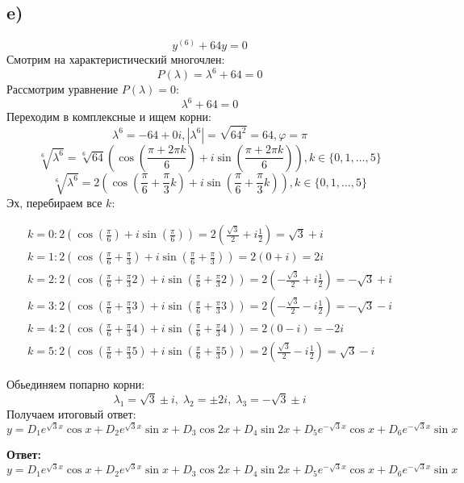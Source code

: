 \documentclass[a4paper, 12pt]{article}
\begin{document}
\subsection*{e)}
\[
y^{(6)} + 64y = 0
\]
Смотрим на характеристический многочлен:
\[
P(\lambda) = \lambda^6  + 64 = 0
\]
Рассмотрим уравнение $P(\lambda) = 0$:
\[
\lambda^6 + 64= 0
\]
Переходим в комплексные и ищем корни:
\[
\lambda^6 = -64 +0i, |\lambda^6| = \sqrt{64^2} = 64, \varphi = \pi
\]
\[
\sqrt[6]{\lambda^6} =
\sqrt[6]{64}
\left(
\cos 
\left(
\frac{\pi + 2 \pi k}{6}
\right)
+i
\sin
\left(
\frac{\pi + 2 \pi k}{6}
\right)
\right), k \in \{0, 1, \ldots, 5\}
\]
\[
\sqrt[6]{\lambda^6} =
2
\left(
\cos 
\left(
\frac{\pi}{6} + \frac{\pi}{3} k
\right)
+i
\sin
\left(
\frac{\pi}{6} + \frac{\pi}{3} k
\right)
\right), k \in \{0, 1, \ldots, 5\}
\]
Эх, перебираем все $k$:
\begin{flushleft}
\begin{equation*}
\begin{gathered}
k = 0:
 2 \left( \cos  \left(
\frac{\pi}{6}
\right) 
+ i \sin \left(
\frac{\pi}{6}
\right) \right)
=
2 \left(
\frac{\sqrt{3}}{2} + i\frac{1}{2}
\right)
=
\sqrt{3} + i 
\\
k = 1:
 2 \left( \cos  \left(
\frac{\pi}{6} + \frac{\pi}{3}
\right) 
+ i \sin \left(
\frac{\pi}{6} + \frac{\pi}{3}
\right) \right)
=
2 \left(
0 + i
\right)
=2i 
\\
k = 2:
 2 \left( \cos  \left(
\frac{\pi}{6} + \frac{\pi}{3} 2
\right) 
+ i \sin \left(
\frac{\pi}{6} + \frac{\pi}{3} 2
\right) \right)
=
2 \left(
-\frac{\sqrt{3}}{2} + i\frac{1}{2}
\right)
=
-\sqrt{3} + i
\\
k = 3:
 2 \left( \cos  \left(
\frac{\pi}{6} + \frac{\pi}{3} 3
\right) 
+ i \sin \left(
\frac{\pi}{6} + \frac{\pi}{3} 3
\right) \right)
=
2 \left(
-\frac{\sqrt{3}}{2} - i\frac{1}{2}
\right)
=
-\sqrt{3} -i
\\
 k = 4:
 2 \left( \cos  \left(
\frac{\pi}{6} + \frac{\pi}{3} 4
\right) 
+ i \sin \left(
\frac{\pi}{6} + \frac{\pi}{3} 4
\right) \right)
=
2 \left(
0 - i
\right)
= -2i
\\
k = 5:
 2 \left( \cos  \left(
\frac{\pi}{6} + \frac{\pi}{3} 5
\right) 
+ i \sin \left(
\frac{\pi}{6} + \frac{\pi}{3} 5
\right) \right)
=
2 \left(
\frac{\sqrt{3}}{2} - i \frac{1}{2}
\right)
=
\sqrt{3} - i
\end{gathered}
\end{equation*}
\end{flushleft}
Обьединяем попарно корни:
\[
\lambda_1 =  \sqrt{3} \pm i, \; \lambda_2 =  \pm 2i, \; \lambda_3 =  -\sqrt{3} \pm i
\]
Получаем итоговый ответ:
\[
y = D_1 e^{\sqrt{3} x} \cos x 
+
D_2 e^{\sqrt{3} x} \sin x
+
D_3 \cos 2x
+
D_4 \sin 2x
+
D_5 e^{-\sqrt{3} x} \cos x
+
D_6 e^{-\sqrt{3} x} \sin x
\]
\begin{center}
\textbf{Ответ: } 
\[
y = D_1 e^{\sqrt{3} x} \cos x 
+
D_2 e^{\sqrt{3} x} \sin x
+
D_3 \cos 2x
+
D_4 \sin 2x
+
D_5 e^{-\sqrt{3} x} \cos x
+
D_6 e^{-\sqrt{3} x} \sin x
\]
\end{center}
\clearpage
\end{document}
